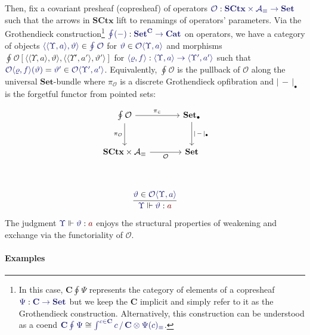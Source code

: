\documentclass[11pt]{article}
\theoremstyle{definition}
\theoremstyle{remark}
\numberwithin{equation}{section}
\def\IModeColorName{MidnightBlue}
\def\OModeColorName{Maroon}
\newcommand\IMode[1]{{\color{\IModeColorName}{#1}}}
\newcommand\OMode[1]{{\color{\OModeColorName}{#1}}}
\newcommand\Member[2]{\IMode{#1}\in\IMode{#2}}
\newcommand\EqMember[3]{\IMode{#1}=\IMode{#2}\in\IMode{#3}}
\newcommand\Of[2]{\IMode{#1} : \IMode{#2}}
\newcommand\Arities{\mathcal{A}}
\newcommand\Operators{\mathcal{O}}
\newcommand\Cats{\mathbf{Cat}}
\newcommand\Discrete[1]{#1_{\equiv}}
\newcommand\Sets{\mathbf{Set}}
\newcommand\SCtx{\mathbf{SCtx}}
\newcommand\IsOperator[3]{\IMode{#1}\Vdash \IMode{#2} : \OMode{#3}}
\newcommand\Grothendieck[2]{\oint^{#1} #2#1}
\newcommand\Pair[2]{\langle #1, #2 \rangle}
\newcommand\FLift[2]{
  \Operators\langle#1%
  \ifthenelse{\equal{#2}{}}{}{, #2}\rangle
}
\newcommand\SSingleton{\bullet}
\newcommand\Forget[1]{|\, #1\, |}
\newcommand\Coslice[2]{#1\, /\, #2}
\newcommand\Hom[3]{#1\left[#2,#3\right]}
\begin{document}
Then, fix a covariant presheaf (copresheaf) of operators
$\Of{\Operators}{\SCtx\times\Discrete{\Arities}\to\Sets}$ such that the arrows
in $\SCtx$ lift to renamings of operators' parameters. Via the Grothendieck
construction\footnote{In this case, $\mathbf{C}\Grothendieck{}{\Psi}$
  represents the category of elements of a copresheaf
  $\Of{\Psi}{\mathbf{C}\to\Sets}$ but we keep the $\mathbf{C}$ implicit and
  simply refer to it as the Grothendieck construction.  Alternatively, this
  construction can be understood as a coend
$\IMode{\mathbf{C}\Grothendieck{}{\Psi}}\cong \IMode{\int^{c \in
\mathbf{C}}\Coslice{c}{\mathbf{C}} \otimes \Discrete{\Psi(c)}}$.}
$\Of{\Grothendieck{}{(-)}}{\Sets^{\mathbf{C}}\to\Cats}$ on operators, we have a
category of objects
$\Member{\Pair{\Pair{\Upsilon}{a}}{\vartheta}}{\Grothendieck{}{\Operators}}$
for $\Member{\vartheta}{\Operators\Pair{\Upsilon}{a}}$ and morphisms
$\Hom{\Grothendieck{}{\Operators}}{\Pair{\Pair{\Upsilon}{a}}{\vartheta}}{\Pair{\Pair{\Upsilon'}{a'}}{\vartheta'}}$
for $\Of{\Pair{\varrho}{f}}{\Pair{\Upsilon}{a}\to\Pair{\Upsilon'}{a'}}$ such
that
$\EqMember{\FLift{\varrho}{f}(\vartheta)}{\vartheta'}{\Operators\Pair{\Upsilon'}{a'}}$.
Equivalently, $\Grothendieck{}{\Operators}$ is the pullback of $\Operators$
along the universal $\Sets$-bundle where $\pi_{\Operators}$ is a discrete
Grothendieck opfibration and $\Forget{-}_{\SSingleton}$ is the forgetful functor
from pointed sets:

\[
\begin{tikzcd}[ampersand replacement = \&, sep = large]
  {\Grothendieck{}{\Operators}}
    \arrow[r, "{\pi_{\in}}"]
    \arrow[d, "{\pi_{\Operators}}" left]
  \& {\Sets_{\SSingleton}}
    \arrow[d, "{\Forget{-}_{\SSingleton}}"] \\
  {\SCtx\times\Discrete{\Arities}}
     \arrow[r, "{\Operators}" below]
  \& {\Sets} \\
\end{tikzcd}
\]

\[
  \infer{
    \IsOperator{\Upsilon}{\vartheta}{a}
  }{
    \Member{\vartheta}{\Operators\langle\Upsilon,a\rangle}
  }
\]

The judgment $\IsOperator{\Upsilon}{\vartheta}{a}$ enjoys the structural
properties of weakening and exchange via the functoriality of
$\Operators$.

\paragraph{Examples}
\end{document}
